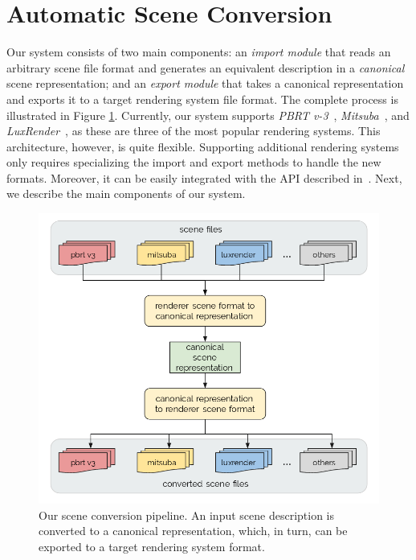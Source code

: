 \section{Automatic Scene Conversion} 
\label{sec:systemarch}

Our system consists of two main components: an {\it import module} that reads an arbitrary scene file format and generates an equivalent description in a {\it canonical} scene representation; and an {\it export module} that takes a canonical representation and exports it to a target rendering system file format. The complete process is illustrated in Figure \ref{fig:sysarch}. 
Currently, our system supports \textit{PBRT v-3}~\cite{PBRT:v3}, \textit{Mitsuba}~\cite{mitsuba}, and \textit{LuxRender}~\cite{luxrender}, as these are three of the most popular rendering systems.
This architecture, however, is quite flexible. Supporting additional rendering systems only requires specializing the import and export methods to handle the new formats. Moreover, it can be easily integrated with the API described in~\cite{Santos:2018:FBKSD}.   
%
Next, we describe the main components of our system.





\begin{figure}[h]
\centering
\includegraphics[width=0.8\linewidth]{figs/3_system_architecture/architecture.png}
\caption{Our scene conversion pipeline. An input scene description is converted to a canonical representation, which, in turn, can be exported to a target rendering system format.}
\label{fig:sysarch}
\end{figure}

